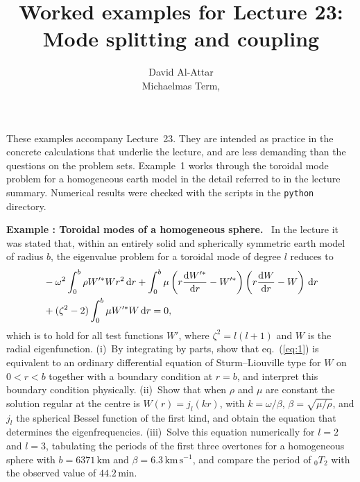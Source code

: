 \documentclass[a4paper,12pt]{paper}
\title{Worked examples for Lecture 23: Mode splitting and coupling}
\author{David Al-Attar \\ Michaelmas Term, \the\year}
\newcounter{example}
\renewenvironment{example}[1]{%
  \refstepcounter{example}%
  \begin{mdframed}[linewidth=1pt,innertopmargin=6pt,innerbottommargin=6pt]%
  \noindent\textbf{Example \theexample: #1.}\ }{%
  \end{mdframed}}
\begin{document}
\maketitle

\noindent These examples accompany Lecture~23. They are intended as practice in the concrete
calculations that underlie the lecture, and are less demanding than the questions on the
problem sets. Example~1 works through the toroidal mode problem for a homogeneous earth
model in the detail referred to in the lecture summary. Numerical results were checked with
the scripts in the \texttt{python} directory.

\begin{example}{Toroidal modes of a homogeneous sphere}
In the lecture it was stated that, within an entirely solid and spherically symmetric earth
model of radius $b$, the eigenvalue problem for a toroidal mode of degree $l$ reduces to
\begin{align}
&-\omega^{2}\int_{0}^{b}\rho W'^{*}Wr^{2}\,\mathrm{d} r
+\int_{0}^{b}\mu\left(r\frac{\mathrm{d} W'^{*}}{\mathrm{d} r}-W'^{*}\right)\left(r\frac{\mathrm{d} W}{\mathrm{d} r}-W\right)\,\mathrm{d} r\nonumber\\
&+(\zeta^{2}-2)\int_{0}^{b}\mu W'^{*}W\,\mathrm{d} r=0,
\label{eq:1}
\end{align}
which is to hold for all test functions $W'$, where $\zeta^{2}=l(l+1)$ and $W$ is the radial
eigenfunction. (i)~By integrating by parts, show that eq.~(\ref{eq:1}) is equivalent to an
ordinary differential equation of Sturm--Liouville type for $W$ on $0<r<b$ together with a
boundary condition at $r=b$, and interpret this boundary condition physically. (ii)~Show that
when $\rho$ and $\mu$ are constant the solution regular at the centre is $W(r)=j_{l}(kr)$,
with $k=\omega/\beta$, $\beta=\sqrt{\mu/\rho}$, and $j_{l}$ the spherical Bessel function of
the first kind, and obtain the equation that determines the eigenfrequencies. (iii)~Solve this
equation numerically for $l=2$ and $l=3$, tabulating the periods of the first three overtones
for a homogeneous sphere with $b=6371\,\mathrm{km}$ and $\beta=6.3\,\mathrm{km\,s^{-1}}$, and
compare the period of ${}_{0}T_{2}$ with the observed value of $44.2\,\mathrm{min}$.
\end{example}
\end{document}
